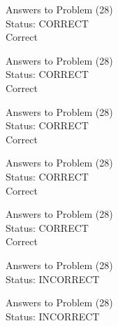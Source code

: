 \documentclass[11pt]{article}
\begin{document}
\begin{minipage}[t]{0.5\textwidth}
  {\centering
  
  Answers to Problem (28)\\
  Status: CORRECT\\
  Correct\\
  }
\end{minipage}
\begin{minipage}[t]{0.5\textwidth}
  {\centering
  
  Answers to Problem (28)\\
  Status: CORRECT\\
  Correct\\
  }
\end{minipage}
\begin{minipage}[t]{0.5\textwidth}
  {\centering
  
  Answers to Problem (28)\\
  Status: CORRECT\\
  Correct\\
  }
\end{minipage}
\begin{minipage}[t]{0.5\textwidth}
  {\centering
  
  Answers to Problem (28)\\
  Status: CORRECT\\
  Correct\\
  }
\end{minipage}
\begin{minipage}[t]{0.5\textwidth}
  {\centering
  
  Answers to Problem (28)\\
  Status: CORRECT\\
  Correct\\
  }
\end{minipage}
\begin{minipage}[t]{0.5\textwidth}
  {\centering
  
  Answers to Problem (28)\\
  Status: INCORRECT\\
  
  }
\end{minipage}
\begin{minipage}[t]{0.5\textwidth}
  {\centering
  
  Answers to Problem (28)\\
  Status: INCORRECT\\
  
  }
\end{minipage}
\end{document}
